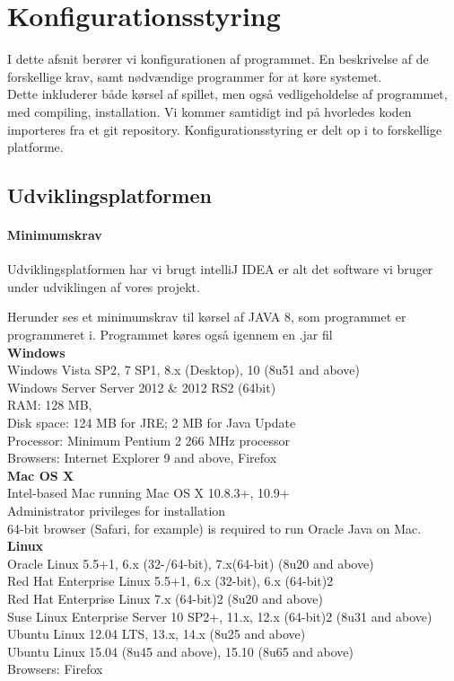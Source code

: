 \chapter{Konfigurationsstyring}

I dette afsnit berører vi konfigurationen af programmet.
En beskrivelse af de forskellige krav, samt nødvændige programmer for at køre systemet. 
\\Dette inkluderer både kørsel af spillet, men også vedligeholdelse af programmet, med compiling, installation.
Vi kommer samtidigt ind på hvorledes koden importeres fra et git repository.
Konfigurationsstyring er delt op i to forskellige platforme.

\section{Udviklingsplatformen}

\subsubsection{Minimumskrav}

Udviklingsplatformen har vi brugt intelliJ  IDEA er alt det software vi bruger under udviklingen af vores projekt.

Herunder ses et minimumskrav til kørsel af JAVA 8, som programmet er programmeret i. Programmet køres også igennem en .jar fil\\

\textbf{Windows}
\\Windows Vista SP2, 7 SP1, 8.x (Desktop), 10 (8u51 and above)
\\Windows Server Server 2012 \& 2012 RS2 (64bit)
\\RAM: 128 MB, 
\\Disk space: 124 MB for JRE; 2 MB for Java Update
\\Processor: Minimum Pentium 2 266 MHz processor
\\Browsers: Internet Explorer 9 and above, Firefox \\

\textbf{Mac OS X}
\\Intel-based Mac running Mac OS X 10.8.3+, 10.9+
\\Administrator privileges for installation
\\64-bit browser (Safari, for example) is required to run Oracle Java on Mac. \\

\textbf{Linux}
\\Oracle Linux 5.5+1, 6.x (32-/64-bit), 7.x(64-bit) (8u20 and above)
\\Red Hat Enterprise Linux 5.5+1, 6.x (32-bit), 6.x (64-bit)2
\\Red Hat Enterprise Linux 7.x (64-bit)2 (8u20 and above)
\\Suse Linux Enterprise Server 10 SP2+, 11.x, 12.x (64-bit)2 (8u31 and above)
\\Ubuntu Linux 12.04 LTS, 13.x, 14.x (8u25 and above)
\\Ubuntu Linux 15.04 (8u45 and above), 15.10 (8u65 and above)
\\Browsers: Firefox \\

